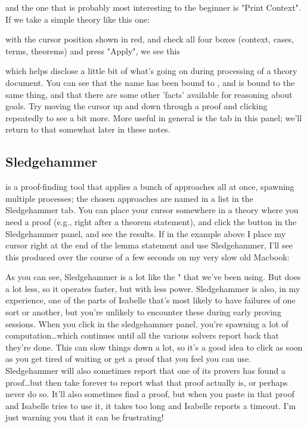 and the one that is probably most interesting to the beginner is "Print Context". If we take a simple theory like this one:

with the cursor position shown in red, and check all four boxes (context, cases, terms, theorems) and press "Apply", we see this

which helps disclose a little bit of what's going on during processing of a theory document. You can see that the name  has been bound to , and  is bound to the same thing, and that there are some other 'facts' available for reasoning about goals. 
\task
Try moving the cursor up and down through a proof and clicking  repeatedly to see a bit more. 
\etask
More useful in general is the  tab in this panel; we'll return to that somewhat later in these notes.

\subsection{Sledgehammer}
 is a proof-finding tool that applies a bunch of approaches all at once, spawning multiple processes; the chosen approaches are named in a list in the Sledgehammer tab. You can place your cursor somewhere in a theory where you need a proof (e.g., right after a theorem statement), and click the  button in the Sledgehammer panel, and see the results. If in the example above I place my cursor right at the end of the lemma statement and use Sledgehammer, I'll see this produced over the course of a few seconds on my very slow old Macbook:

As you can see, Sledgehammer is a lot like the " that we've been using. But  does a lot less, so it operates faster, but with less power.  Sledgehammer is also, in my experience, one of the parts of Isabelle that's most likely to have failures of one sort or another, but you're unlikely to encounter these during early proving sessions. When you click  in the sledgehammer panel, you're spawning a lot of computation…which continues until all the various solvers report back that they're done. This can slow things down a lot, so it's a good idea to click  as soon as you get tired of waiting or get a proof that you feel you can use. Sledgehammer will also sometimes report that one of its provers has found a proof…but then take forever to report what that proof actually is, or perhaps never do so. It'll also sometimes find a proof, but when you paste in that proof and Isabelle tries to use it, it takes too long and Isabelle reports a timeout. I'm just warning you that it can be frustrating! 

